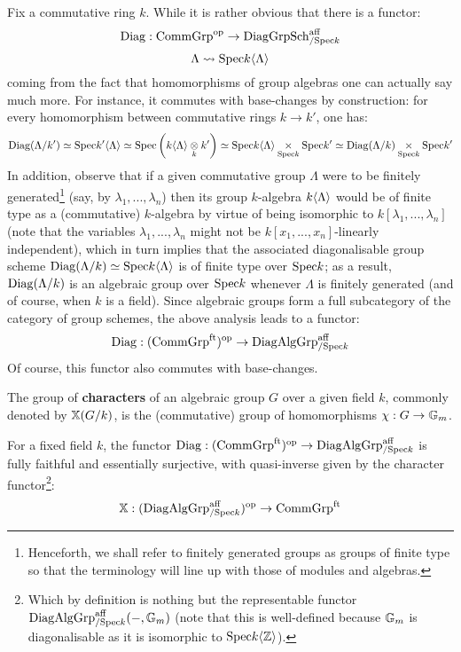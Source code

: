             \begin{remark} \label{remark: diagonalisable_algebraic_groups}
                Fix a commutative ring $k$. While it is rather obvious that there is a functor:
                    $$\mathrm{Diag}: \mathrm{Comm}\mathrm{Grp}^{\mathrm{op}} \to \mathrm{Diag}\mathrm{Grp}\mathrm{Sch}^{\mathrm{aff}}_{/\mathrm{Spec} k}$$
                    $$\Lambda \leadsto \mathrm{Spec} k\langle\Lambda\rangle$$
                coming from the fact that homomorphisms of group algebras one can actually say much more. For instance, it commutes with base-changes by construction: for every homomorphism between commutative rings $k \to k'$, one has:
                    $$\Diag(\Lambda/k') \cong \Spec k'\<\Lambda\> \cong \Spec \left(k\<\Lambda\> \tensor_k k'\right) \cong \Spec k\<\Lambda\> \x_{\Spec k} \Spec k' \cong \Diag(\Lambda/k) \x_{\Spec k} \Spec k'$$
                In addition, observe that if a given commutative group $\Lambda$ were to be finitely generated\footnote{Henceforth, we shall refer to finitely generated groups as groups of finite type so that the terminology will line up with those of modules and algebras.} (say, by $\lambda_1, ..., \lambda_n$) then its group $k$-algebra $k\langle\Lambda\rangle$ would be of finite type as a (commutative) $k$-algebra by virtue of being isomorphic to $k[\lambda_1, ..., \lambda_n]$ (note that the variables $\lambda_1, ..., \lambda_n$ might not be $k[x_1, ..., x_n]$-linearly independent), which in turn implies that the associated diagonalisable group scheme $\mathrm{Diag}(\Lambda/k) \simeq \mathrm{Spec} k\langle\Lambda\rangle$ is of finite type over $\mathrm{Spec} k$; as a result, $\mathrm{Diag}(\Lambda/k)$ is an algebraic group over $\mathrm{Spec} k$ whenever $\Lambda$ is finitely generated (and of course, when $k$ is a field). Since algebraic groups form a full subcategory of the category of group schemes, the above analysis leads to a functor:
                    $$\mathrm{Diag}: (\mathrm{Comm}\mathrm{Grp}^{\mathrm{ft}})^{\mathrm{op}} \to \mathrm{Diag}\mathrm{Alg}\mathrm{Grp}^{\mathrm{aff}}_{/\mathrm{Spec} k}$$
                Of course, this functor also commutes with base-changes. 
            \end{remark}
            \begin{definition}[Characters] \label{def: characters_of_algebraic_groups}
                The group of \textbf{characters} of an algebraic group $G$ over a given field $k$, commonly denoted by $\mathbb{X}(G/k)$, is the (commutative) group of homomorphisms $\chi: G \to \mathbb{G}_m$.
            \end{definition}
            \begin{proposition} \label{prop: pontryagin_duality_for_algebraic_groups}
                For a fixed field $k$, the functor $\mathrm{Diag}: (\mathrm{Comm}\mathrm{Grp}^{\mathrm{ft}})^{\mathrm{op}} \to \mathrm{Diag}\mathrm{Alg}\mathrm{Grp}^{\mathrm{aff}}_{/\mathrm{Spec} k}$ is fully faithful and essentially surjective, with quasi-inverse given by the character functor\footnote{Which by definition is nothing but the representable functor $\mathrm{Diag}\mathrm{Alg}\mathrm{Grp}^{\mathrm{aff}}_{/\mathrm{Spec} k}(-, \mathbb{G}_m)$ (note that this is well-defined because $\mathbb{G}_m$ is diagonalisable as it is isomorphic to $\mathrm{Spec} k\langle\mathbb{Z}\rangle$).}:
                    $$\mathbb{X}: (\mathrm{Diag}\mathrm{Alg}\mathrm{Grp}^{\mathrm{aff}}_{/\mathrm{Spec} k})^{\mathrm{op}} \to \mathrm{Comm}\mathrm{Grp}^{\mathrm{ft}}$$
            \end{proposition}
